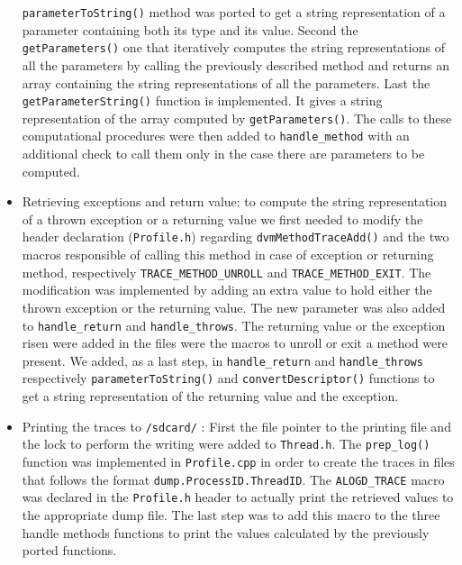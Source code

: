 \begin{itemize}
    \texttt{parameterToString()} method was ported to get a string
    representation of a parameter containing both its type and its
    value. Second the \texttt{getParameters()} one that iteratively computes
    the string representations of all the parameters by calling the
    previously described method and returns an array containing the
    string representations of all the parameters. Last the
    \texttt{getParameterString()} function is implemented. It gives a string
    representation of the array computed by \texttt{getParameters()}. The calls
    to these computational procedures were then added to \texttt{handle\_method}
    with an additional check to call them only in the case there are
    parameters to be computed.
  \item Retrieving exceptions and return value: to compute the string
    representation of a thrown exception or a returning value we first
    needed to modify the header declaration (\texttt{Profile.h}) regarding
    \texttt{dvmMethodTraceAdd()} and the two macros responsible of calling this
    method in case of exception or returning method, respectively
    \texttt{TRACE\_METHOD\_UNROLL} and \texttt{TRACE\_METHOD\_EXIT}. The modification was
    implemented by adding an extra value to hold either the thrown
    exception or the returning value. The new parameter was also added
    to \texttt{handle\_return} and \texttt{handle\_throws}. The returning value or the
    exception risen were added in the files were the macros to unroll
    or exit a method were present. We added, as a last step, in
    \texttt{handle\_return} and \texttt{handle\_throws} respectively \texttt{parameterToString()}
    and \texttt{convertDescriptor()} functions to get a string representation
    of the returning value and the exception.
  \item Printing the traces to \texttt{/sdcard/} : First the file pointer to
    the printing file and the lock to perform the writing were added
    to \texttt{Thread.h}. The \texttt{prep\_log()} function was implemented in
    \texttt{Profile.cpp} in order to create the traces in files that follows
    the format \texttt{dump.ProcessID.ThreadID}. The \texttt{ALOGD\_TRACE} macro was
    declared in the \texttt{Profile.h} header to actually print the retrieved
    values to the appropriate dump file. The last step was to add this
    macro to the three handle methods functions to print the values
    calculated by the previously ported functions.
\end{itemize}
